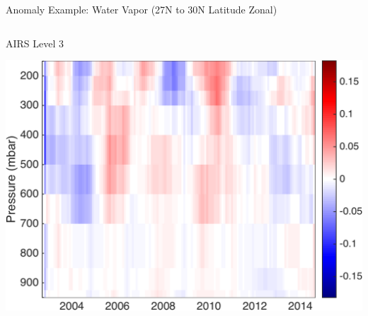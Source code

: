 \documentclass[10pt,t]{beamer}
\begin{document}
\begin{frame}[label={sec:orgaec1bb4}]{Anomaly Example: Water Vapor (27N to 30N Latitude Zonal)}
\vspace{-0.15in}
\begin{columns}
\begin{column}{0.55\columnwidth}
\begin{block}{\footnotesize AIRS Level 3}
\vspace{-0.1in}
\begin{center}
\includegraphics[width=0.8\linewidth]{./oFigs/water_lati_30_L3.png}
\end{center}
\end{block}
\end{column}
\end{columns}
\end{frame}
\end{document}
